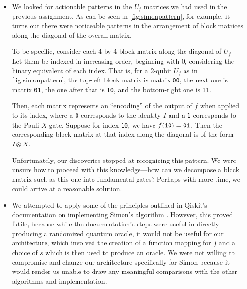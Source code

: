 \documentclass[12pt]{article}
\begin{document}
\begin{itemize}
    \item We looked for actionable patterns in the $U_f$ matrices we had used in the previous assignment. As can be seen in \autoref{fig:simonpattern}, for example, it turns out there were noticeable patterns in the arrangement of block matrices along the diagonal of the overall matrix.

        To be specific, consider each 4-by-4 block matrix along the diagonal of $U_f$.
        Let them be indexed in increasing order, beginning with $0$, considering the binary equivalent of each index.
        That is, for a 2-qubit $U_f$ as in \autoref{fig:simonpattern}, the top-left block matrix is matrix \texttt{00}, the next one is matrix \texttt{01}, the one after that is \texttt{10}, and the bottom-right one is \texttt{11}.

        Then, each matrix represents an ``encoding'' of the output of $f$ when applied to its index, where a \texttt{0} corresponds to the identity $I$ and a \texttt{1} corresponds to the Pauli $X$ gate.
        Suppose for index \texttt{10}, we have $f(\text{\texttt{10}}) = \text{\texttt{01}}$.
        Then the corresponding block matrix at that index along the diagonal is of the form $I \otimes X$.

        Unfortunately, our discoveries stopped at recognizing this pattern.
        We were unsure how to proceed with this knowledge---how can we decompose a block matrix such as this one into fundamental gates?
        Perhaps with more time, we could arrive at a reasonable solution.
    \item We attempted to apply some of the principles outlined in Qiskit's documentation on implementing Simon's algorithm \cite{qiskitsimon}.
        However, this proved futile, because while the documentation's steps were useful in directly producing a randomized quantum oracle, it would not be useful for our architecture, which involved the creation of a function mapping for $f$ and a choice of $s$ which is then used to produce an oracle.
        We were not willing to compromise and change our architecture specifically for Simon because it would render us unable to draw any meaningful comparisons with the other algorithms and implementation.
\end{itemize}
\end{document}
